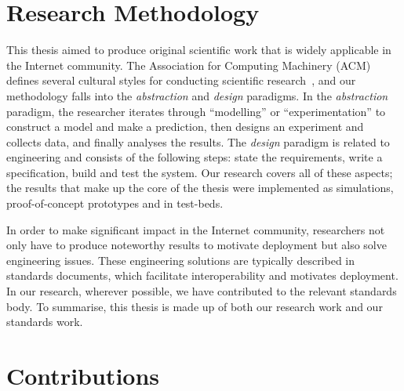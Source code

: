 

\section{Research Methodology}

This thesis aimed to produce original scientific work that is widely
applicable in the Internet community. The Association for Computing Machinery
(ACM) defines several cultural styles for conducting scientific
research~\cite{Denning:CS.Method}, and our methodology falls into the
\textit{abstraction} and \textit{design} paradigms. In the \emph{abstraction}
paradigm, the researcher iterates through ``modelling'' or ``experimentation''
to construct a model and make a prediction, then designs an experiment and
collects data, and finally analyses the results. The \emph{design} paradigm is
related to  engineering and consists of the following steps: state the
requirements, write a specification, build and test the system. Our research
covers all of these aspects; the results that make up the core of the thesis
were implemented as simulations, proof-of-concept prototypes and in test-beds.

In order to make significant impact in the Internet community, researchers not
only have to produce noteworthy results to motivate deployment but also solve
engineering issues. These engineering solutions are typically
described in standards documents, which facilitate interoperability and
motivates deployment. In our research, wherever possible, we have contributed
to the relevant standards body. To summarise, this thesis is made up
of both our research work and our standards work.


\section{Contributions}


